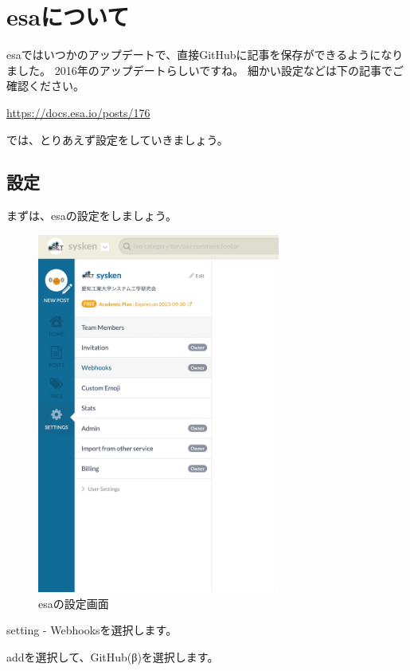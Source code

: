 \chapter{esaについて}

esaではいつかのアップデートで、直接GitHubに記事を保存ができるようになりました。
2016年のアップデートらしいですね。
細かい設定などは下の記事でご確認ください。

\url{https://docs.esa.io/posts/176}

では、とりあえず設定をしていきましょう。

\section{設定}

  まずは、esaの設定をしましょう。
  
  \begin{figure}[H]
    \centering
    \includegraphics[width=8cm]{./image/02-chap7/esa-setting.png}
    \caption{esaの設定画面}
    \label{chap7-esa-setting-image}
  \end{figure}

  setting - Webhooksを選択します。

  addを選択して、GitHub(β)を選択します。 

